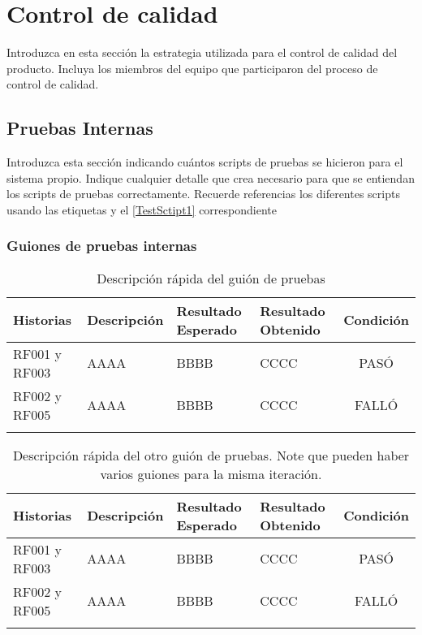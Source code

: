 \chapter{Control de calidad}
Introduzca en esta sección la estrategia utilizada para el control de calidad del producto. Incluya los miembros del equipo que participaron del proceso de control de calidad.
\section{Pruebas Internas}
Introduzca esta sección indicando cuántos scripts de pruebas se hicieron para el sistema propio. Indique cualquier detalle que crea necesario para que se entiendan los scripts de pruebas correctamente. Recuerde referencias los diferentes scripts usando las etiquetas y el \ref{TestSctipt1} correspondiente

\subsection{Guiones de pruebas internas}
\begin{longtable}{ | p{2cm} | p{3cm} | p{4cm} | p{4cm} | c |}
      \hline
      \textbf{Historias} & \textbf{Descripción} & \textbf{Resultado Esperado} & \textbf{Resultado Obtenido} & \textbf{Condición}\\
      \hline
      RF001 y RF003 & AAAA & BBBB & CCCC & \color{ForestGreen}PASÓ\\
      \hline
      RF002 y RF005 & AAAA & BBBB & CCCC & \color{Mahogany}FALLÓ\\
      \hline
      
      \caption{Descripción rápida del guión de pruebas}
      \label{TestScript1}
\end{longtable}

\begin{longtable}{ | p{2cm} | p{3cm} | p{4cm} | p{4cm} | c |}
      \hline
      \textbf{Historias} & \textbf{Descripción} & \textbf{Resultado Esperado} & \textbf{Resultado Obtenido} & \textbf{Condición}\\
      \hline
      RF001 y RF003 & AAAA & BBBB & CCCC & \color{ForestGreen}PASÓ\\
      \hline
      RF002 y RF005 & AAAA & BBBB & CCCC & \color{Mahogany}FALLÓ\\
      \hline
      
      \caption{Descripción rápida del otro guión de pruebas. Note que pueden haber varios guiones para la misma iteración.}
      \label{TestScript1}
\end{longtable}

